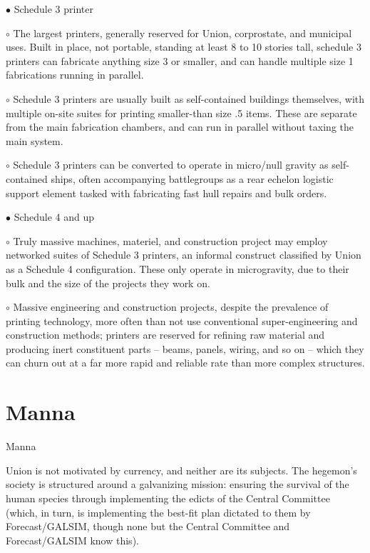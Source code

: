 $\bullet$    Schedule 3 printer

         $\circ$     The largest printers, generally reserved for Union, corprostate, and municipal
             uses. Built in place, not portable, standing at least 8 to 10 stories tall, schedule 3
             printers can fabricate anything size 3 or smaller, and can handle multiple size 1
             fabrications running in parallel.

         $\circ$     Schedule 3 printers are usually built as self-contained buildings themselves, with
             multiple on-site suites for printing smaller-than size .5 items. These are separate
             from the main fabrication chambers, and can run in parallel without taxing the
             main system.

         $\circ$     Schedule 3 printers can be converted to operate in micro/null gravity as self-
             contained ships, often accompanying battlegroups as a rear echelon logistic
             support element tasked with fabricating fast hull repairs and bulk orders.

$\bullet$    Schedule 4 and up

         $\circ$   Truly massive machines, materiel, and construction project may employ
             networked suites of Schedule 3 printers, an informal construct classified by Union
             as a Schedule 4 configuration. These only operate in microgravity, due to their
             bulk and the size of the projects they work on.

         $\circ$     Massive engineering and construction projects, despite the prevalence of printing
             technology, more often than not use conventional super-engineering and
             construction methods; printers are reserved for refining raw material and
             producing inert constituent parts -- beams, panels, wiring, and so on -- which they
             can churn out at a far more rapid and reliable rate than more complex structures.




\section{Manna}
Manna

Union is not motivated by currency, and neither are its subjects. The hegemon’s society is
structured around a galvanizing mission: ensuring the survival of the human species through
implementing the edicts of the Central Committee (which, in turn, is implementing the best-fit
plan dictated to them by Forecast/GALSIM, though none but the Central Committee and
Forecast/GALSIM know this).


